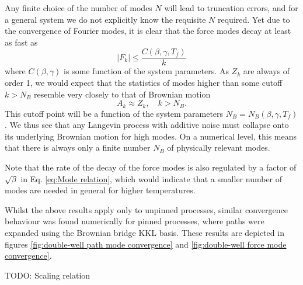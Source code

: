 Any finite choice of the number of modes $N$ will lead to truncation errors, and for a general system we do not explicitly know the requisite $N$ required. Yet due to the convergence of Fourier modes, it is clear that the force modes decay at least as fast as
\begin{equation}
|F_k| \leq \frac{C(\beta, \gamma, T_f)}{k}
\end{equation}
where $C(\beta, \gamma)$ is some function of the system parameters. As $Z_k$ are always of order 1, we would expect that the statistics of modes higher than some cutoff $k > N_B$ resemble very closely to that of Brownian motion
\begin{equation}
A_k \approx Z_k, \quad k > N_B.
\end{equation}
This cutoff point will be a function of the system parameters $N_B = N_B(\beta, \gamma, T_f)$. We thus see that any Langevin process with additive noise must collapse onto its underlying Brownian motion for high modes. On a numerical level, this means that there is always only a finite number $N_B$ of physically relevant modes.

Note that the rate of the decay of the force modes is also regulated by a factor of $\sqrt{\beta}$ in Eq. \ref{eq:Mode relation}, which would indicate that a smaller number of modes are needed in general for higher temperatures.

Whilst the above results apply only to unpinned processes, similar convergence behaviour was found numerically for pinned processes, where paths were expanded using the Brownian bridge KKL basis. These results are depicted in figures \ref{fig:double-well path mode convergence} and \ref{fig:double-well force mode convergence}.

{\color{red} TODO: Scaling relation}

